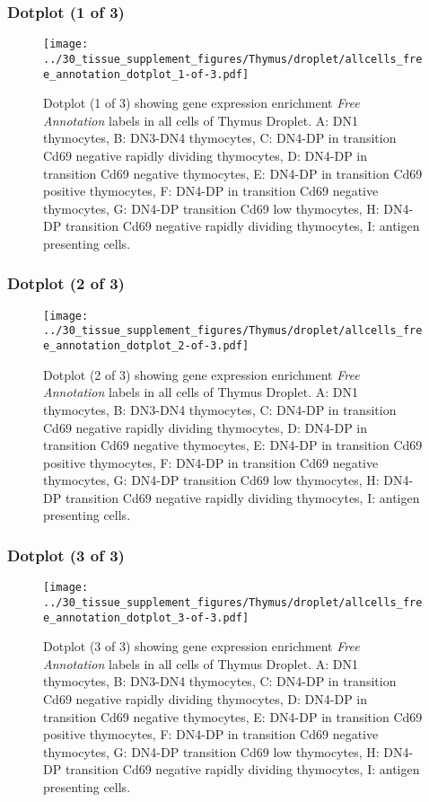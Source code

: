 \clearpage

\subsubsection{Dotplot (1 of 3)}
\begin{figure}[h]
\centering
\texttt{[image: ../30\_tissue\_supplement\_figures/Thymus/droplet/allcells\_free\_annotation\_dotplot\_1-of-3.pdf]}

\caption{ Dotplot (1 of 3)  showing gene expression enrichment \emph{Free Annotation} labels in all cells of Thymus Droplet. A: DN1 thymocytes, B: DN3-DN4 thymocytes, C: DN4-DP in transition Cd69 negative rapidly dividing thymocytes, D: DN4-DP in transition Cd69 negative thymocytes, E: DN4-DP in transition Cd69 positive thymocytes, F: DN4-DP in transition Cd69 negative thymocytes, G: DN4-DP transition Cd69 low thymocytes, H: DN4-DP transition Cd69 negative rapidly dividing thymocytes, I: antigen presenting cells.}
\end{figure}


\clearpage

\subsubsection{Dotplot (2 of 3)}
\begin{figure}[h]
\centering
\texttt{[image: ../30\_tissue\_supplement\_figures/Thymus/droplet/allcells\_free\_annotation\_dotplot\_2-of-3.pdf]}

\caption{ Dotplot (2 of 3)  showing gene expression enrichment \emph{Free Annotation} labels in all cells of Thymus Droplet. A: DN1 thymocytes, B: DN3-DN4 thymocytes, C: DN4-DP in transition Cd69 negative rapidly dividing thymocytes, D: DN4-DP in transition Cd69 negative thymocytes, E: DN4-DP in transition Cd69 positive thymocytes, F: DN4-DP in transition Cd69 negative thymocytes, G: DN4-DP transition Cd69 low thymocytes, H: DN4-DP transition Cd69 negative rapidly dividing thymocytes, I: antigen presenting cells.}
\end{figure}


\clearpage

\subsubsection{Dotplot (3 of 3)}
\begin{figure}[h]
\centering
\texttt{[image: ../30\_tissue\_supplement\_figures/Thymus/droplet/allcells\_free\_annotation\_dotplot\_3-of-3.pdf]}

\caption{ Dotplot (3 of 3)  showing gene expression enrichment \emph{Free Annotation} labels in all cells of Thymus Droplet. A: DN1 thymocytes, B: DN3-DN4 thymocytes, C: DN4-DP in transition Cd69 negative rapidly dividing thymocytes, D: DN4-DP in transition Cd69 negative thymocytes, E: DN4-DP in transition Cd69 positive thymocytes, F: DN4-DP in transition Cd69 negative thymocytes, G: DN4-DP transition Cd69 low thymocytes, H: DN4-DP transition Cd69 negative rapidly dividing thymocytes, I: antigen presenting cells.}
\end{figure}

